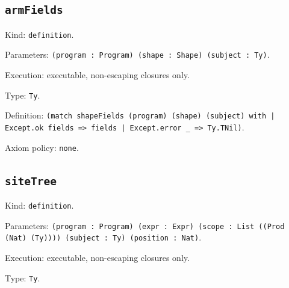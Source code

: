 \documentclass[11pt]{article}
\begin{document}
\subsection*{\texttt{armFields}}
\noindent Kind: \texttt{definition}.\par
\noindent Parameters: \texttt{(program : Program) (shape : Shape) (subject : Ty)}.\par
\noindent Execution: executable, non-escaping closures only.\par
\noindent Type: \texttt{Ty}.\par
\noindent Definition: \texttt{(match shapeFields (program) (shape) (subject) with | Except.ok fields => fields | Except.error \_ => Ty.TNil)}.\par
\noindent Axiom policy: \texttt{none}.\par
\subsection*{\texttt{siteTree}}
\noindent Kind: \texttt{definition}.\par
\noindent Parameters: \texttt{(program : Program) (expr : Expr) (scope : List ((Prod (Nat) (Ty)))) (subject : Ty) (position : Nat)}.\par
\noindent Execution: executable, non-escaping closures only.\par
\noindent Type: \texttt{Ty}.\par
\end{document}

